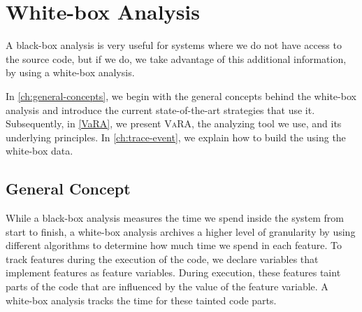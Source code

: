 



\section{White-box Analysis}\label{ch:Whitebox}
A black-box analysis is very useful for systems where we do not have access to the source code, but if we do, 
we take advantage of this additional information, by using a white-box analysis. 

In \autoref{ch:general-concepts}, we begin with the general concepts behind the white-box analysis and 
introduce the current state-of-the-art strategies that use it.
Subsequently, in \autoref{VaRA}, we present \textsc{VaRA}, the analyzing tool we use, and its underlying principles. 
In \autoref{ch:trace-event}, we explain how to build the {\perfInfluenceModel} using the white-box data.

\subsection{General Concept}\label{wb:general-concept}

While a black-box analysis measures the time we spend inside the system from start to finish, 
a white-box analysis archives a higher level of granularity by using different algorithms to determine how much time we spend in each feature. 
To track features during the execution of the code, we declare variables that implement features as feature variables. 
During execution, these features taint parts of the code that are influenced by the value of the feature variable. 
A white-box analysis tracks the time for these tainted code parts.

